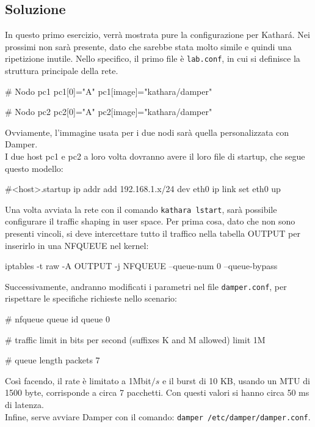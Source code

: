 \subsection{Soluzione}
In questo primo esercizio, verrà mostrata pure la configurazione per Kathará. Nei prossimi non sarà presente, dato che sarebbe stata molto simile e quindi una ripetizione inutile.
Nello specifico, il primo file è \texttt{lab.conf}, in cui si definisce la struttura principale della rete.
\begin{kathara}
# Nodo pc1
pc1[0]="A"
pc1[image]="kathara/damper"

# Nodo pc2
pc2[0]="A"
pc2[image]="kathara/damper"
\end{kathara}
Ovviamente, l'immagine usata per i due nodi sarà quella personalizzata con Damper. \\ 
I due host pc1 e pc2 a loro volta dovranno avere il loro file di startup, che segue questo modello:
\begin{kathara}
#<host>.startup
ip addr add 192.168.1.x/24 dev eth0
ip link set eth0 up
\end{kathara}
Una volta avviata la rete con il comando \texttt{kathara lstart}, sarà possibile configurare il traffic shaping in user space.
Per prima cosa, dato che non sono presenti vincoli, si deve intercettare tutto il traffico nella tabella OUTPUT per inserirlo in una NFQUEUE nel kernel:
\newpage
\begin{bash}
iptables -t raw -A OUTPUT -j NFQUEUE --queue-num 0 --queue-bypass
\end{bash}
Successivamente, andranno modificati i parametri nel file \texttt{damper.conf}, per rispettare le specifiche richieste nello scenario:
\begin{damper}
# nfqueue queue id
queue 0

# traffic limit in bits per second (suffixes K and M allowed)
limit 1M

# queue length
packets 7
\end{damper}
Così facendo, il rate è limitato a 1Mbit$/s$ e il burst di 10 KB, usando un MTU di 1500 byte, corrisponde a circa 7 pacchetti. Con questi valori si hanno circa 50 ms di latenza. \\
\vspace*{0.01\textheight}
Infine, serve avviare Damper con il comando: \texttt{damper /etc/damper/damper.conf}.

